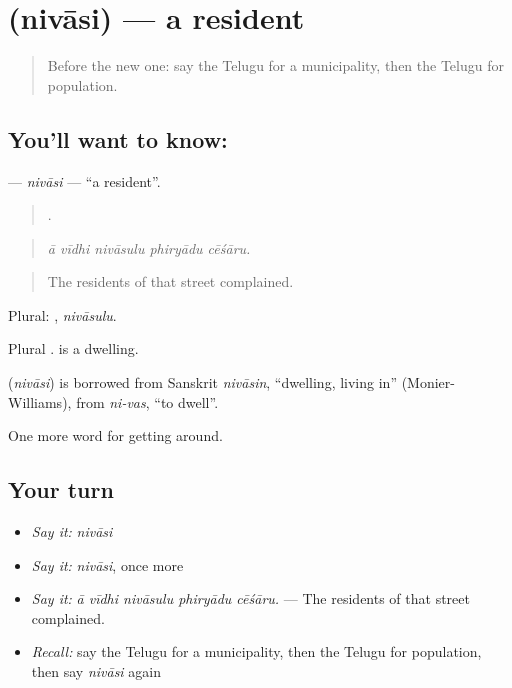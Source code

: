 \section[\texorpdfstring{\te{నివాసి} (nivāsi)}{నివాసి (nivāsi)}]{ (nivāsi) — a resident}

\label{lesson:TE-C465-nivasi}



\begin{quote}
Before the new one: say the Telugu for a municipality, then the Telugu for population.
\end{quote}

\subsection*{You'll want to know: }
\textbf{} — \emph{nivāsi} — \textquotedblleft{}a resident\textquotedblright{}.

\begin{quote}
    .
\end{quote}

\begin{quote}
\emph{ā vīdhi nivāsulu phiryādu cēśāru.}
\end{quote}

\begin{quote}
The residents of that street complained.
\end{quote}

Plural: , \emph{nivāsulu}.

Plural .  is a dwelling.

\begin{cousinweb}
\textbf{} (\emph{nivāsi}) is borrowed from Sanskrit \emph{nivāsin}, \textquotedblleft{}dwelling, living in\textquotedblright{} (Monier-Williams), from \emph{ni-vas}, \textquotedblleft{}to dwell\textquotedblright{}.
\end{cousinweb}

\begin{grammarlens}[title={What you've built}]
One more word for getting around.
\end{grammarlens}

\subsection*{Your turn}
\begin{itemize}
\raggedright
  \item \emph{Say it:} \emph{nivāsi}
  \item \emph{Say it:} \emph{nivāsi}, once more
  \item \emph{Say it:} \emph{ā vīdhi nivāsulu phiryādu cēśāru.} — The residents of that street complained.
  \item \emph{Recall:} say the Telugu for a municipality, then the Telugu for population, then say \emph{nivāsi} again
\end{itemize}

